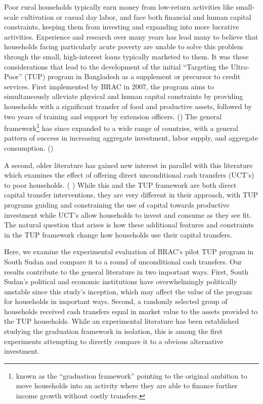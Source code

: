 \documentclass[12pt,article]{article}
\begin{document}
Poor rural households typically earn money from low-return activities like
small-scale cultivation or casual day labor, and face both financial and human
capital constraints, keeping them from investing and expanding into more lucrative
activities. Experience and research over many years has lead many to believe that
households facing particularly acute poverty are unable to solve this problem through
the small, high-interest loans typically marketed to them. It was these
considerations that lead to the development of the initial ``Targeting the
Ultra-Poor'' (TUP) program in Bangladesh as a supplement or precursor to credit
services. First implemented by BRAC in 2007, the program aims to simultaneously
alleviate physical and human capital constraints by providing households with a
significant transfer of food and productive assets, followed by two years of training
and support by extension officers. (\cite{bandiera2017}) The general framework\footnote{known as the
``graduation framework'' pointing to the original ambition to move households into an
activity where they are able to finance further income growth without costly
transfers.} has since expanded to a wide range of countries, with a general pattern
of success in increasing aggregate investment, labor supply, and aggregate
consumption. (\cite{banerjee2015})

A second, older literature has gained new interest in parallel with this
literature which examines the effect of offering direct unconditional cash transfers
(UCT's) to poor households. (\cite{haushofer-shapiro2013} \cite{blattman2014} \cite{blattman2013})
While this and the TUP framework are both direct capital transfer
interventions, they are very different in their approach, with TUP programs guiding
and constraining the use of capital towards productive investment while UCT's allow
households to invest and consume as they see fit. The natural question that arises is
how these additional features and constraints in the TUP framework change how
households use their capital transfers.

Here, we examine the experimental evaluation of BRAC's pilot TUP program in South
Sudan and compare it to a round of unconditional cash transfers. Our results
contribute to the general literature in two important ways. First, South Sudan's
political and economic institutions have overwhelmingly politically unstable since
this study's inception, which may affect the value of the program for
households in important ways. Second, a randomly selected group of households
received cash transfers equal in market value to the assets provided to the TUP
households. While an experimental literature has been established studying the
graduation framework in isolation, this is among the first experiments attempting to
directly compare it to a obvious alternative investment.
\end{document}
